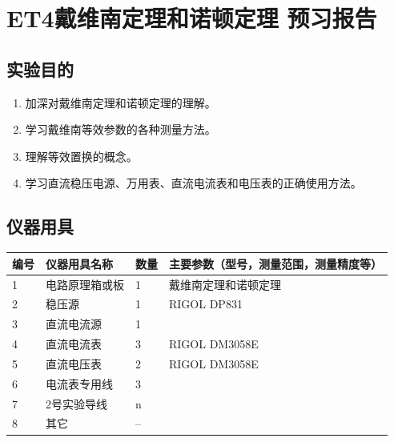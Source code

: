 \documentclass[dvipsnames, svgnames,a4paper,11pt]{article}
\begin{document}
	\clearpage
	\tableofcontents
	\clearpage
	
	
	
	
	\setcounter{section}{0}
\section{ET4戴维南定理和诺顿定理 \quad\heiti 预习报告}
	
	\subsection{实验目的}
	\begin{enumerate}
		\item 加深对戴维南定理和诺顿定理的理解。
	\item 学习戴维南等效参数的各种测量方法。
	\item 理解等效置换的概念。
	\item 学习直流稳压电源、万用表、直流电流表和电压表的正确使用方法。
	\end{enumerate}
	
	\subsection{仪器用具}
	\begin{table}[htbp]
		\centering
		\renewcommand\arraystretch{1.6}
		\begin{tabular}{|p{}|p{}|p{}|p{}|}
			\hline
			编号& 仪器用具名称 & 数量 &  主要参数（型号，测量范围，测量精度等） \\
			\hline
			1& 电路原理箱或板 & 1 & 戴维南定理和诺顿定理 \\
			\hline
			2& 稳压源 & 1 &  RIGOL DP831\\
			\hline
			3& 直流电流源 & 1 &  \\
			\hline
			4& 直流电流表 & 3 & RIGOL DM3058E \\
			\hline
			5& 直流电压表 & 2 &  RIGOL DM3058E\\
			\hline
			6& 电流表专用线 & 3 &  \\
			\hline
			7& 2号实验导线 & n &  \\
			\hline
			8& 其它 & -- &  \\
			\hline
		\end{tabular}
	\end{table}
	
\end{document}
